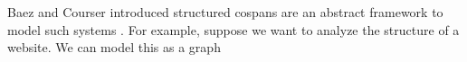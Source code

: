 \message{ !name(reopn.tex)}\documentclass{amsart}
\begin{document}
Baez and Courser introduced structured cospans are an
abstract framework to model such systems
\cite{bc_strCsp}. For example, suppose we want to
analyze the structure of a website. We can model this as a
graph 
\end{document}
